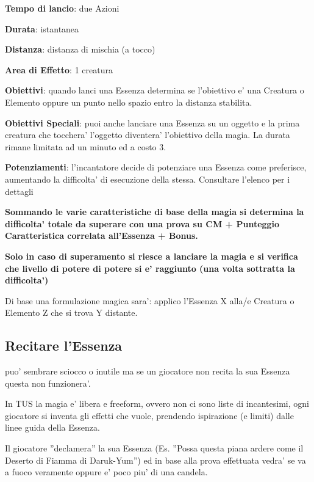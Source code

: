 \documentclass[a4paper,11pt,twoside,openany]{book}
\begin{document}
	\textbf{Tempo di lancio}: due Azioni
	
	\textbf{Durata}: istantanea
	
	\textbf{Distanza}: distanza di mischia (a tocco)
	
	\textbf{Area di Effetto}: 1 creatura 
	
	\textbf{Obiettivi}: quando lanci una Essenza determina se l'obiettivo e' una Creatura o Elemento oppure un punto nello spazio entro la distanza stabilita.
	
	\textbf{Obiettivi Speciali}: puoi anche lanciare una Essenza su un oggetto e la prima creatura che tocchera' l'oggetto diventera' l'obiettivo della magia. La durata rimane limitata ad un minuto ed a costo 3.
	
	\textbf{Potenziamenti}: l'incantatore decide di potenziare una Essenza come preferisce, aumentando la difficolta' di esecuzione della stessa. Consultare l'elenco per i dettagli
	
	\textbf{Sommando le varie caratteristiche di base della magia si determina la difficolta' totale da superare con una prova su CM + Punteggio Caratteristica correlata all'Essenza + Bonus.}
	
	\textbf{Solo in caso di superamento si riesce a lanciare la magia e si verifica che livello di potere di potere si e' raggiunto (una volta sottratta la difficolta')}
	
	Di base una formulazione magica sara': applico l'Essenza X alla/e Creatura o Elemento Z che si trova Y distante.
	
	\subsection{Recitare l'Essenza}
	
	\label{recitare-lessenza}
	
	puo' sembrare sciocco o inutile ma se un giocatore non recita la sua Essenza questa non funzionera'.
	
	In TUS la magia e' libera e freeform, ovvero non ci sono liste di incantesimi, ogni giocatore si inventa gli effetti che vuole, prendendo ispirazione (e limiti) dalle linee guida della Essenza.
	
	Il giocatore ''declamera'' la sua Essenza (Es. ''Possa questa piana ardere come il Deserto di Fiamma di Daruk-Yum'') ed in base alla prova effettuata vedra' se va a fuoco veramente oppure e' poco piu' di una candela.
	
\end{document}
